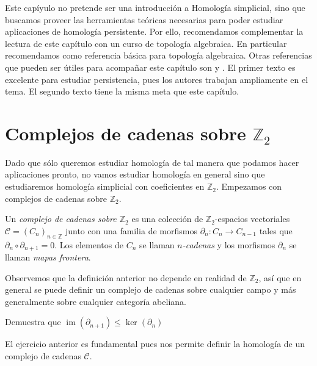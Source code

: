 \documentclass{standalone}
\begin{document}
	Este capíyulo no pretende ser una introducción a Homología simplicial, sino que buscamos proveer las herramientas teóricas necesarias para poder estudiar aplicaciones de homología persistente. Por ello, recomendamos complementar la lectura de este capítulo con un curso de topología algebraica. En particular recomendamos \cite{munkres:1984:algebraic:topology} como referencia básica para topología algebraica. Otras referencias que pueden ser útiles para acompañar este capítulo son \cite[Capítulos IV y VII]{edelsbrunner:2010:computational} y \cite{scoville:2019:discrete:morse}. El primer texto es excelente para estudiar persistencia, pues los autores trabajan ampliamente en el tema. El segundo texto tiene la misma meta que este capítulo. 
	
	\section{Complejos de cadenas sobre $\mathbb{Z}_{2}$}
	
	Dado que sólo queremos estudiar homología de tal manera que podamos hacer aplicaciones pronto, no vamos estudiar homología en general sino que estudiaremos homología simplicial con coeficientes en $\mathbb{Z}_{2}$. Empezamos con complejos de cadenas sobre $\mathbb{Z}_{2}$.
	
	\begin{definition}\label{def:chain_complex_z_2}
		Un \emph{complejo de cadenas sobre $\mathbb{Z}_{2}$} es una colección de $\mathbb{Z}_{2}$-espacios vectoriales $\mathcal{C}=(C_{n})_{n\in\mathbb{Z}}$ junto con una familia de morfismos $\partial_{n}\colon C_{n}\rightarrow C_{n-1}$ tales que $\partial_{n}\circ\partial_{n+1}=0$. Los elementos de $C_{n}$ se llaman \emph{$n$-cadenas} y los morfismos $\partial_{n}$ se llaman \emph{mapas frontera}.
	\end{definition}
	
	Observemos que la definición anterior no depende en realidad de $\mathbb{Z}_{2}$, así que en general se puede definir un complejo de cadenas sobre cualquier campo y más generalmente sobre cualquier categoría abeliana.
	
	\begin{exercise}\label{prop:partial_partial}
		Demuestra que $\operatorname{im}(\partial_{n+1})\leq\operatorname{ker}(\partial_{n})$
	\end{exercise}
	
	El ejercicio anterior es fundamental pues nos permite definir la homología de un complejo de cadenas $\mathcal{C}$.
	
\end{document}
